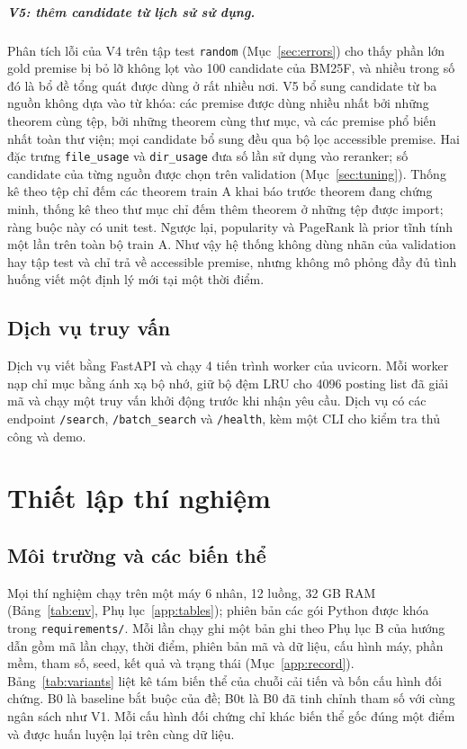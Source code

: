 \documentclass[11pt,a4paper,oneside]{report}
\newcommand{\code}[1]{\texttt{#1}}
\begin{document}
\paragraph{V5: thêm candidate từ lịch sử sử dụng.} Phân tích lỗi của V4 trên tập test \code{random}
(Mục~\ref{sec:errors}) cho thấy phần lớn gold premise bị bỏ lỡ không lọt vào 100 candidate của BM25F, và nhiều trong số đó
là bổ đề tổng quát được dùng ở rất nhiều nơi. V5 bổ sung candidate từ ba nguồn không dựa vào từ khóa: các premise được dùng
nhiều nhất bởi những theorem cùng tệp, bởi những theorem cùng thư mục, và các premise phổ biến nhất toàn thư viện; mọi candidate bổ sung đều qua bộ lọc accessible premise. Hai đặc trưng \code{file\_usage} và \code{dir\_usage} đưa số lần sử dụng vào
reranker; số candidate của từng nguồn được chọn trên validation (Mục~\ref{sec:tuning}). Thống kê theo tệp chỉ đếm các
theorem train A khai báo trước theorem đang chứng minh, thống kê theo thư mục chỉ đếm thêm theorem ở những tệp được import;
ràng buộc này có unit test. Ngược lại, popularity và PageRank là prior tĩnh tính một lần trên toàn bộ train A. Như vậy hệ
thống không dùng nhãn của validation hay tập test và chỉ trả về accessible premise, nhưng không mô phỏng đầy đủ
tình huống viết một định lý mới tại một thời điểm.

\section{Dịch vụ truy vấn}

Dịch vụ viết bằng FastAPI và chạy 4 tiến trình worker của uvicorn. Mỗi worker nạp chỉ mục bằng ánh xạ bộ nhớ, giữ bộ đệm
LRU cho \num{4096} posting list đã giải mã và chạy một truy vấn khởi động trước khi nhận yêu cầu. Dịch vụ có các endpoint
\code{/search}, \code{/batch\_search} và \code{/health}, kèm một CLI cho kiểm tra thủ công và demo.

\chapter{Thiết lập thí nghiệm}\label{sec:setup}

\section{Môi trường và các biến thể}

Mọi thí nghiệm chạy trên một máy 6 nhân, 12 luồng, 32 GB RAM (Bảng~\ref{tab:env}, Phụ lục~\ref{app:tables}); phiên bản các
gói Python được khóa trong \code{requirements/}. Mỗi lần chạy ghi một bản ghi theo Phụ lục B của hướng dẫn gồm mã lần chạy,
thời điểm, phiên bản mã và dữ liệu, cấu hình máy, phần mềm, tham số, seed, kết quả và trạng thái (Mục~\ref{app:record}).
Bảng~\ref{tab:variants} liệt kê tám biến thể của chuỗi cải tiến và bốn cấu hình đối chứng. B0 là baseline bắt buộc của đề;
B0t là B0 đã tinh chỉnh tham số với cùng ngân sách như V1. Mỗi cấu hình đối chứng chỉ khác biến thể gốc đúng một điểm và được
huấn luyện lại trên cùng dữ liệu.
\end{document}
